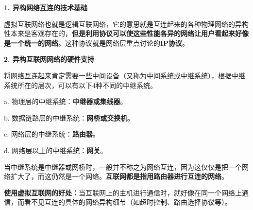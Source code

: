 \textbf{{1. 异构网络互连的技术基础}}

{虚拟互联网络也就是逻辑互联网络，}{它的意思就是互连起来的各种物理网络的异构性本来是客观存在的，}\textbf{但是利用协议可以使这些性能各异的网络让用户看起来好像是一个统一的网络}{。这种协议就是网络层重点讨论的}{\textbf{IP协议}}{。}

{\textbf{2. 异构互联网网络的硬件支持}}

{将网络互连起来肯定需要一些中间设备（又称为中间系统或中继系统），根据中继系统所在的层次，}{可以有以下4种不同的中继系统。}

a. 物理层的中继系统：\textbf{中继器或集线器}。

b. 数据链路层的中继系统：\textbf{网桥或交换机}。

c. 网络层的中继系统：\textbf{路由器}。

d. 网络层以上的中继系统：\textbf{网关}。

当中继系统是中继器或网桥时，一般并不称之为网络互连，因为这仅仅是把一个网络扩大了，而这仍然是一个网络。{\textbf{互联网都是指用路由器进行互连的网络}}。

{\textbf{使用虚拟互联网的好处：}}当互联网上的主机进行通信时，就好像在同一个网络上通信，而看不见互连的具体的网络异构细节（如超时控制、路由选择协议等）。
